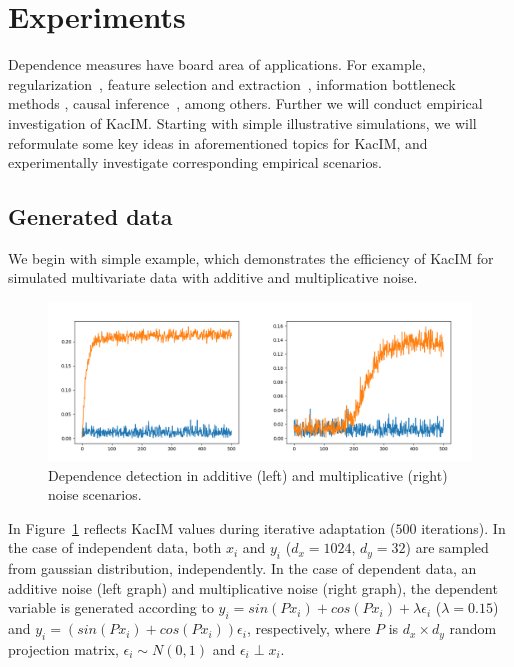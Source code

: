 \documentclass{article}
\begin{document}
\section{Experiments}
\label{section:experiments}
Dependence measures have board area of applications. For example, regularization~\cite{?,?}, feature selection and extraction~\cite{EigenHSIC}, information bottleneck methods \cite{Ma2020TheHB}, causal inference~\cite{NIPS2008_f7664060}, among others. Further we will conduct empirical investigation of KacIM. Starting with simple illustrative simulations, we will reformulate some key ideas in aforementioned topics for KacIM, and experimentally investigate corresponding empirical scenarios.


\subsection{Generated data}

We begin with simple example, which demonstrates the efficiency of KacIM for simulated multivariate data with additive and multiplicative noise.

\begin{figure}[t]
\label{fig:experiments_simulation}
\centering
\includegraphics[scale=0.25]{./out.png}
\caption{Dependence detection in additive (left) and multiplicative (right) noise scenarios.}
\end{figure}

In Figure~\ref{fig:experiments_simulation} reflects KacIM values during iterative adaptation ($500$ iterations). In the case of independent data, both $x_{i}$ and $y_{i}$ ($d_{x} = 1024$, $d_{y} = 32$) are sampled from gaussian distribution, independently. In the case of dependent data, an additive noise (left graph) and multiplicative noise (right graph), the dependent variable is generated according to $y_{i} = sin(P x_{i}) + cos(P x_{i}) + \lambda \epsilon_{i}$ ($\lambda = 0.15$) and $y_{i} = (sin(P x_{i}) + cos(P x_{i})) \epsilon_{i}$, respectively, where $P$ is $d_{x} \times d_{y}$ random projection matrix, $\epsilon_{i} \sim N(0,1)$ and $\epsilon_{i} \perp x_{i}$.
\end{document}
